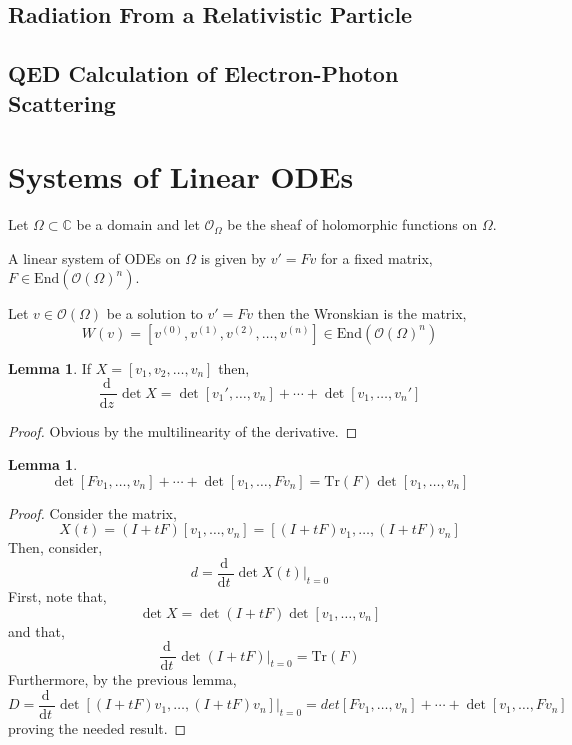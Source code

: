 \documentclass[12pt]{extarticle}
\newcommand{\End}[1]{\mathrm{End}\left(#1\right)}
\renewcommand{\d}[1]{ \mathrm{d}#1 \:}
\newcommand{\deriv}[2]{\frac{\d{#1}}{\d{#2}}}
\theoremstyle{definition}
\newtheorem{lemma}[theorem]{Lemma}
\newenvironment{definition}[1][Definition:]{\begin{trivlist}
\item[\hskip \labelsep {\bfseries #1}]}{\end{trivlist}}
\renewcommand{\O}{\mathcal{O}}
\newcommand{\C}{\mathbb{C}}
\begin{document}
\subsection{Radiation From a Relativistic Particle}

\subsection{QED Calculation of Electron-Photon Scattering}

\section{Systems of Linear ODEs}

\newcommand{\struct}[1]{\mathcal{O}_{#1}}
\newcommand{\tr}[1]{\mathrm{Tr}\left( #1 \right)}
\newcommand{\M}{\mathcal{M}}

\begin{definition}
Let $\Omega \subset \C$ be a domain and let $\struct{\Omega}$ be the sheaf of holomorphic functions on $\Omega$. 
\end{definition}

\begin{definition}
A linear system of ODEs on $\Omega$ is given by $v' = Fv$ for a fixed matrix,
$F \in \End{\O(\Omega)^n}$.
\end{definition}

\begin{definition}
Let $v \in \O(\Omega)$ be a solution to $v' = F v$ then the Wronskian is the matrix,
\[ W(v) = [v^{(0)}, v^{(1)}, v^{(2)}, \dots, v^{(n)}] \in \End{\O(\Omega)^n} \]
\end{definition}

\begin{lemma}
If $X = [v_1, v_2, \dots, v_n]$ then,
\[ \deriv{}{z} \det{X} = \det{[v_1', \dots, v_n]} + \cdots + \det{[v_1, \dots, v_n']} \]
\end{lemma}

\begin{proof}
Obvious by the multilinearity of the derivative.
\end{proof}

\begin{lemma}
\[ \det{[F v_1, \dots, v_n]} + \cdots + \det{[v_1, \dots, F v_n]} = \tr{F} \det{[v_1, \dots, v_n]} \]
\end{lemma}

\begin{proof}
Consider the matrix,
\[ X(t) = (I + t F)[v_1, \dots, v_n] = [ (I + t F) v_1, \dots, (I + t F) v_n] \]
Then, consider,
\[ d = \deriv{}{t} \det{X(t)} \bigg|_{t = 0} \]
First, note that,
\[ \det{X} = \det{(I + t F)} \det{[v_1, \dots, v_n]} \]
and that,
\[ \deriv{}{t} \det{(I + t F)} \bigg|_{t = 0} = \tr{F} \]
Furthermore, by the previous lemma,
\[ D = \deriv{}{t} \det{[ (I + t F) v_1, \dots, (I + t F) v_n]} \bigg|_{t = 0} = det{[F v_1, \dots, v_n]} + \cdots + \det{[v_1, \dots, F v_n]} \]
proving the needed result. 
\end{proof}
\end{document}
